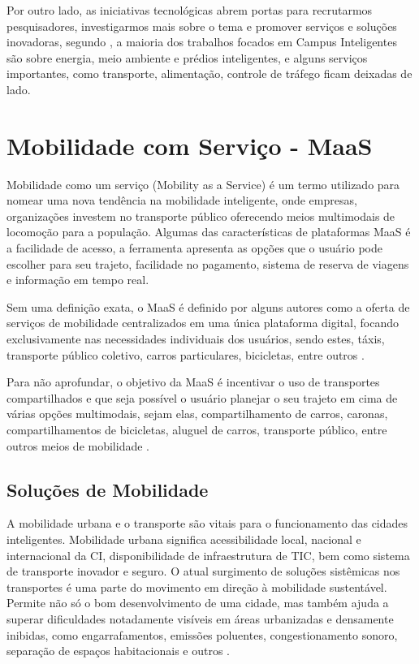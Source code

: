 Por outro lado, as iniciativas tecnológicas abrem portas para recrutarmos pesquisadores, investigarmos mais sobre o tema e promover serviços e soluções inovadoras, segundo \cite{alghamdi}, a maioria dos trabalhos focados em Campus Inteligentes são sobre energia, meio ambiente e prédios inteligentes, e alguns serviços importantes, como transporte, alimentação, controle de tráfego ficam deixadas de lado.

\section{Mobilidade com Serviço - MaaS}

Mobilidade como um serviço (Mobility as a Service) é um termo utilizado para nomear uma nova tendência na mobilidade inteligente, onde empresas, organizações investem no transporte público oferecendo meios multimodais de locomoção  para a população. Algumas das características de plataformas MaaS é a facilidade de acesso, a ferramenta apresenta as opções que o usuário pode escolher para seu trajeto, facilidade no pagamento, sistema de reserva de viagens e informação em tempo real.

Sem uma definição exata, o MaaS é definido por alguns autores como a oferta de serviços de mobilidade centralizados em uma única plataforma digital, focando exclusivamente nas necessidades individuais dos usuários, sendo estes, táxis, transporte público coletivo, carros particulares, bicicletas, entre outros \cite{jittrapirom, kamargianni, mulley}.

Para não aprofundar, o objetivo da MaaS é incentivar o uso de transportes compartilhados e que seja possível o usuário planejar o seu trajeto em cima de várias opções multimodais, sejam elas, compartilhamento de carros, caronas, compartilhamentos de bicicletas, aluguel de carros, transporte público, entre outros meios de mobilidade \cite{jittrapirom}. 

\subsection{Soluções de Mobilidade}



A mobilidade urbana e o transporte são vitais para o funcionamento das cidades inteligentes. Mobilidade urbana significa acessibilidade local, nacional e internacional da CI, disponibilidade de infraestrutura de TIC, bem como sistema de transporte inovador e seguro.  O atual surgimento de soluções sistêmicas nos transportes é uma parte do movimento em direção à mobilidade sustentável. Permite não só o bom desenvolvimento de uma cidade, mas também ajuda a superar dificuldades notadamente visíveis em áreas urbanizadas e densamente inibidas, como engarrafamentos, emissões poluentes, congestionamento sonoro, separação de espaços habitacionais e outros \cite{opitek}.

